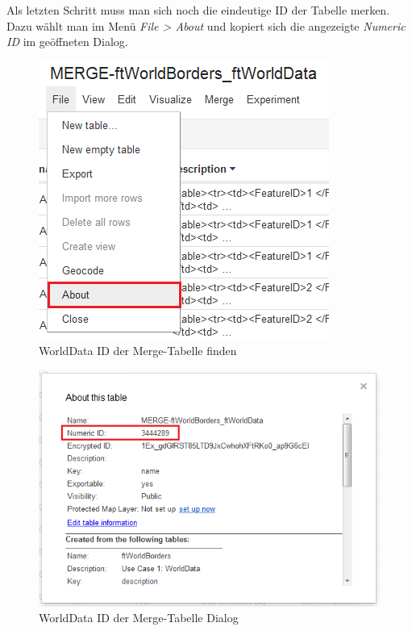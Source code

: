 Als letzten Schritt muss man sich noch die eindeutige ID der Tabelle merken. Dazu wählt man im Menü  \emph{File > About} und kopiert sich die angezeigte \emph{Numeric ID} im geöffneten Dialog.

\begin{figure}[!h]
	\centering
	\includegraphics{images/usecase1-worlddata/worlddata-prepare_fusiontableslayer3.png}
	\caption{WorldData ID der Merge-Tabelle finden}
	\label{worlddata-prepare_fusiontableslayer3.png}
\end{figure}

\begin{figure}[!h]
	\centering
	\includegraphics{images/usecase1-worlddata/worlddata-prepare_fusiontableslayer4.png}
	\caption{WorldData ID der Merge-Tabelle Dialog}
	\label{worlddata-prepare_fusiontableslayer4.png}
\end{figure}

